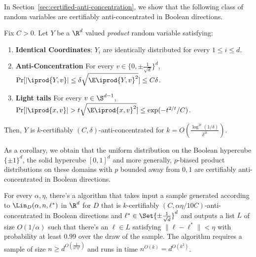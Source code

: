 


In Section~\ref{sec:certified-anti-concentration}, we show that the following class of random variables are certifiably anti-concentrated in Boolean directions. 
\begin{lemma}
Fix $C> 0$. Let $Y$ be a $\R^d$ valued \emph{product} random variable satisfying: 
\begin{enumerate}
\item \textbf{Identical Coordinates}: $Y_i$ are identically distributed for every $1 \leq i \leq d$. 
\item \textbf{Anti-Concentration} For every $v \in \{0,\pm\frac{1}{\sqrt{d}}\}^d$, $\Pr[|\iprod{Y,v}| \leq \delta \sqrt{\E \iprod{Y,v}^2}] \leq C\delta$.
\item \textbf{Light tails} For every $v \in \S^{d-1}$, $\Pr[ |\iprod{x,v}|> t \sqrt{\E \iprod{x,v}^2}] \leq \exp(-t^{2/t}/C)$. 
\end{enumerate}
Then, $Y$ is $k$-certifiably $(C,\delta)$-anti-concentrated for $k = O(\frac{\log^{2t}(1/\delta)}{\delta^{2t}})$.
\end{lemma}

As a corollary, we obtain that the uniform distribution on the Boolean hypercube $\{\pm 1\}^d$, the solid hypercube $[0,1]^d$ and more generally, $p$-biased product distributions on these domains with $p$ bounded away from $0,1$ are certifiably anti-concentrated in Boolean directions. 




\begin{theorem}
For every $\alpha, \eta$, there's a algorithm that takes input a sample generated according to $\Lin_D(\alpha,n,\ell^*)$ in $\R^d$ for  $D$ that is $k$-certifiably $(C,\alpha \eta/10C)$-anti-concentrated in Boolean directions and $\ell^* \in \Set{\pm{\frac{1}{\sqrt{d}}}}^d$ and outputs a list $L$ of size $O(1/\alpha)$ such that there's an $\ell \in L$ satisfying $\|\ell-\ell^*\| <\eta$ with probability at least $0.99$ over the draw of the sample. The algorithm requires a sample of size $n \geq d^{O(\frac{1}{\alpha^2 \eta^2})}$ and runs in time $n^{O(k)} = d^{O(k^2)}$. \label{thm:main2}
\end{theorem}

